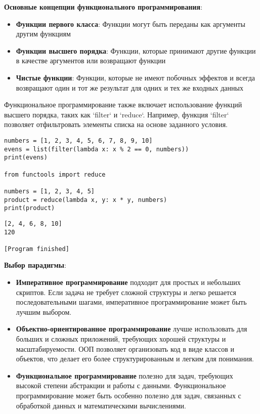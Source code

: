 \textbf{Основные концепции функционального программирования}:
\begin{itemize}
    \item \textbf{Функции первого класса}: Функции могут быть переданы как аргументы другим функциям
    \item \textbf{Функции высшего порядка}: Функции, которые принимают другие функции в качестве аргументов или возвращают функции
    \item \textbf{Чистые функции}: Функции, которые не имеют побочных эффектов и всегда возвращают один и тот же результат для одних и тех же входных данных
\end{itemize}

Функциональное программирование также включает использование функций высшего порядка, таких как `filter` и `reduce`. Например, функция `filter` позволяет отфильтровать элементы списка на основе заданного условия.

\begin{verbatim}
numbers = [1, 2, 3, 4, 5, 6, 7, 8, 9, 10]
evens = list(filter(lambda x: x % 2 == 0, numbers))
print(evens)

from functools import reduce

numbers = [1, 2, 3, 4, 5]
product = reduce(lambda x, y: x * y, numbers)
print(product)
\end{verbatim}

\begin{verbatim}
[2, 4, 6, 8, 10]
120

[Program finished]
\end{verbatim}

\textbf{Выбор парадигмы}:
\begin{itemize}
    \item \textbf{Императивное программирование} подходит для простых и небольших скриптов. Если задача не требует сложной структуры и легко решается последовательными шагами, императивное программирование может быть лучшим выбором.
    \item \textbf{Объектно-ориентированное программирование} лучше использовать для больших и сложных приложений, требующих хорошей структуры и масштабируемости. ООП позволяет организовать код в виде классов и объектов, что делает его более структурированным и легким для понимания.
    \item \textbf{Функциональное программирование} полезно для задач, требующих высокой степени абстракции и работы с данными. Функциональное программирование может быть особенно полезно для задач, связанных с обработкой данных и математическими вычислениями.
\end{itemize}

